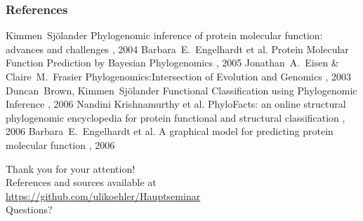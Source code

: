 \documentclass[14pt,xcolor=dvipsnames,pdftex]{beamer}
\begin{document}
\begin{frame}
  \frametitle<presentation>{References}    
  \begin{thebibliography}{10}
  \tiny
  \beamertemplatearticlebibitems
  \bibitem{}
    Kimmen~Sjölander
    \newblock Phylogenomic inference of protein molecular function: advances and challenges
    , 2004
  \bibitem{}
    Barbara~E.~Engelhardt et al.
    \newblock Protein Molecular Function Prediction by Bayesian Phylogenomics
    , 2005
  \bibitem{}
    Jonathan~A.~Eisen \& Claire~M.~Frasier
    \newblock Phylogenomics:Intersection of Evolution and Genomics
    , 2003
  \bibitem{}
    Duncan~Brown, Kimmen~Sjölander
    \newblock Functional Classification using Phylogenomic Inference
    , 2006
  \bibitem{}
    Nandini Krishnamurthy et al.
    \newblock PhyloFacts: an online structural phylogenomic encyclopedia for protein functional and structural classification
    , 2006
  \bibitem{}
    Barbara~E.~Engelhardt et al.
    \newblock A graphical model for predicting protein molecular function
    , 2006
  \end{thebibliography}
\end{frame}

\begin{frame}
 \begin{center}
 {\color{BlueViolet}\large Thank you for your attention!}\\[1cm]
 {\small References and sources available at}\\
 {\small \url{https://github.com/ulikoehler/Hauptseminar}}\\[1cm]
 {\color{BlueViolet}\large Questions?}\\[1cm]
 
 \end{center}
\end{frame}
\end{document}
